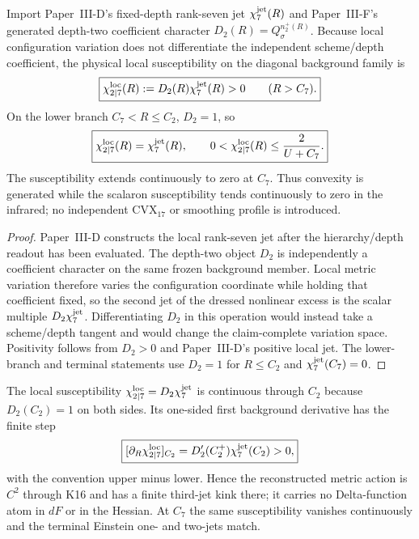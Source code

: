 \documentclass[11pt,a4paper]{article}
\begin{document}
\begin{theorem}
\label{p3e:prop:laur17-active-hessian}
Import Paper~III-D's fixed-depth rank-seven jet
$\chi_7^{\rm jet}(R)$ and Paper~III-F's generated depth-two coefficient
character $D_2(R)=Q_\sigma^{n_2^+(R)}$.  Because local configuration
variation does not differentiate the independent scheme/depth coefficient,
the physical local susceptibility on the diagonal background family is
\begin{equation}
\label{p3e:eq:laur17-active-hessian}
 \boxed{\chi_{2\mid7}^{\rm loc}(R)
 :=D_2(R)\chi_7^{\rm jet}(R)>0\qquad(R>C_7).}
\end{equation}
On the lower branch $C_7<R\le C_2$, $D_2=1$, so
\begin{equation}
\label{p3e:eq:global-positive-hessian-bound}
 \boxed{\chi_{2\mid7}^{\rm loc}(R)=\chi_7^{\rm jet}(R),
 \qquad 0<\chi_{2\mid7}^{\rm loc}(R)\le\frac2{U+C_7}.}
\end{equation}
The susceptibility extends continuously to zero at $C_7$.  Thus convexity is
generated while the scalaron susceptibility tends continuously to zero in the infrared;
no independent $\mathrm{CVX}_{17}$ or smoothing profile is introduced.
\end{theorem}

\begin{proof}
Paper~III-D constructs the local rank-seven jet after the hierarchy/depth
readout has been evaluated.  The depth-two object $D_2$ is independently a
coefficient character on the same frozen background member.  Local metric
variation therefore varies the configuration coordinate while holding that
coefficient fixed, so the second jet of the dressed nonlinear excess is the
scalar multiple $D_2\chi_7^{\rm jet}$.  Differentiating $D_2$ in this
operation would instead take a scheme/depth tangent and would change the
claim-complete variation space.  Positivity follows from $D_2>0$ and
Paper~III-D's positive local jet.  The lower-branch and terminal statements
use $D_2=1$ for $R\le C_2$ and
$\chi_7^{\rm jet}(C_7)=0$.
\end{proof}

\begin{proposition}
\label{p3e:prop:v263-legendre-junction-measure}
The local susceptibility $\chi_{2\mid7}^{\rm loc}=D_2\chi_7^{\rm jet}$ is
continuous through $C_2$ because $D_2(C_2)=1$ on both sides.  Its one-sided
first background derivative has the finite step
\begin{equation}
\label{p3e:eq:v263-k16-hessian-step}
 \boxed{
 [\partial_R\chi_{2\mid7}^{\rm loc}]_{C_2}
 =D_2'(C_2^+)\chi_7^{\rm jet}(C_2)>0,}
\end{equation}
with the convention upper minus lower.  Hence the reconstructed metric action
is $C^2$ through K16 and has a finite third-jet kink there; it carries no
Delta-function atom in $dF$ or in the Hessian.  At $C_7$ the same susceptibility
vanishes continuously and the terminal Einstein one- and two-jets match.
\end{proposition}
\end{document}
